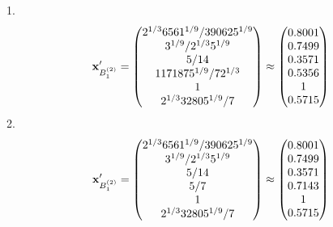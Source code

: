 \documentclass[10pt,a4paper]{article}
\begin{document}
	1.
	\[
		\bold{x}'_{B_1^{(2)}} = 
		\begin{pmatrix}
			{{2^ {1 / 3}}{6561^ {1 / 9}}} / {{390625^ {1 / 9}}} \\
			{{3^ {1 / 9}}} / {{2^ {1 / 3}}{5^ {1 / 9}}} \\
			{{5}} / {{14}} \\
			{{1171875^ {1 / 9}}} / {{7}{2^ {1 / 3}}} \\
			{1}{} \\
			{{2^ {1 / 3}}{32805^ {1 / 9}}} / {{7}} \\
		\end{pmatrix}
		\approx
		\begin{pmatrix}
			0.8001   \\
			0.7499   \\
			0.3571   \\
			0.5356   \\
			1        \\
			0.5715   \\
		\end{pmatrix}
	\]
	2.
	\[
		\bold{x}'_{B_1^{(2)}} = 
		\begin{pmatrix}
			{{2^ {1 / 3}}{6561^ {1 / 9}}} / {{390625^ {1 / 9}}} \\
			{{3^ {1 / 9}}} / {{2^ {1 / 3}}{5^ {1 / 9}}} \\
			{{5}} / {{14}} \\
			{{5}} / {{7}} \\
			{1}{} \\
			{{2^ {1 / 3}}{32805^ {1 / 9}}} / {{7}} \\
		\end{pmatrix}
		\approx
		\begin{pmatrix}
			0.8001   \\
			0.7499   \\
			0.3571   \\
			0.7143   \\
			1        \\
			0.5715   \\
		\end{pmatrix}
	\]
\end{document}

